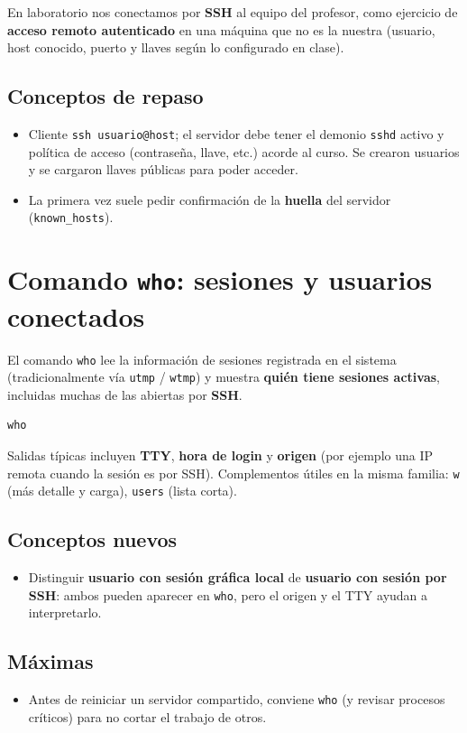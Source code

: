 \documentclass[11pt, letterpaper]{article}
\begin{document}
En laboratorio nos conectamos por \textbf{SSH} al equipo del profesor, como ejercicio de \textbf{acceso remoto autenticado} en una máquina que no es la nuestra (usuario, host conocido, puerto y llaves según lo configurado en clase).
\subsection{Conceptos de repaso}
\label{sec:org23ee3c7}
\begin{itemize}
\item Cliente \texttt{ssh usuario@host}; el servidor debe tener el demonio \texttt{sshd} activo y política de acceso (contraseña, llave, etc.) acorde al curso. Se crearon usuarios y se cargaron llaves públicas para poder acceder.
\item La primera vez suele pedir confirmación de la \textbf{huella} del servidor (\texttt{known\_hosts}).
\end{itemize}
\section{Comando \texttt{who}: sesiones y usuarios conectados}
\label{sec:orgad7010f}

El comando \texttt{who} lee la información de sesiones registrada en el sistema (tradicionalmente vía \texttt{utmp} / \texttt{wtmp}) y muestra \textbf{quién tiene sesiones activas}, incluidas muchas de las abiertas por \textbf{SSH}.

\begin{verbatim}
who
\end{verbatim}

Salidas típicas incluyen \textbf{TTY}, \textbf{hora de login} y \textbf{origen} (por ejemplo una IP remota cuando la sesión es por SSH). Complementos útiles en la misma familia: \texttt{w} (más detalle y carga), \texttt{users} (lista corta).
\subsection{Conceptos nuevos}
\label{sec:org377324a}
\begin{itemize}
\item Distinguir \textbf{usuario con sesión gráfica local} de \textbf{usuario con sesión por SSH}: ambos pueden aparecer en \texttt{who}, pero el origen y el TTY ayudan a interpretarlo.
\end{itemize}
\subsection{Máximas}
\label{sec:org0362f75}
\begin{itemize}
\item Antes de reiniciar un servidor compartido, conviene \texttt{who} (y revisar procesos críticos) para no cortar el trabajo de otros.
\end{itemize}
\end{document}
